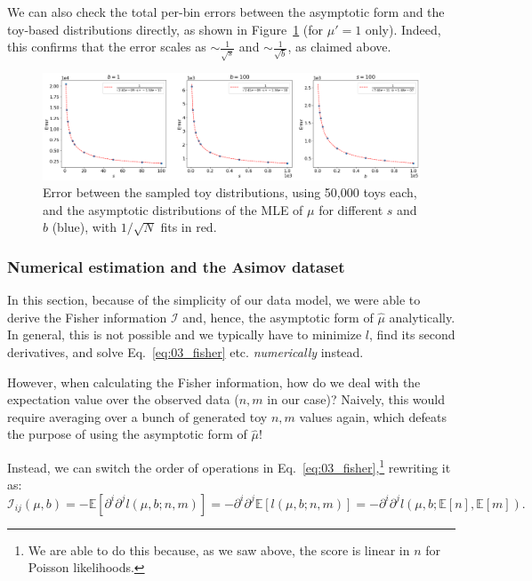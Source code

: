 We can also check the total per-bin errors between the asymptotic form and the toy-based distributions directly, as shown in Figure~\ref{fig:03_mle_errors} (for $\mu' = 1$ only).
Indeed, this confirms that the error scales as $\sim \frac{1}{\sqrt{s}}$ and $\sim \frac{1}{\sqrt{b}}$, as claimed above.

\begin{figure}[htb]
\centering
\includegraphics[width=\textwidth]{figures/03-Stats/05-asymptotic-mle/5.png}
\caption{Error between the sampled toy distributions, using 50,000 toys each, and the asymptotic distributions of the MLE of $\mu$ for different $s$ and $b$ (blue), with $1/\sqrt{N}$ fits in red.}
\label{fig:03_mle_errors}
\end{figure}


\subsubsection{Numerical estimation and the Asimov dataset}
\label{sec:03_pmle_asimov}

In this section, because of the simplicity of our data model, we were able to derive the Fisher information $\mathcal I$ and, hence, the asymptotic form of $\hat \mu$ analytically.
In general, this is not possible and we typically have to minimize $l$, find its second derivatives, and solve Eq.~\ref{eq:03_fisher} etc. \textit{numerically} instead. 

However, when calculating the Fisher information, how do we deal with the expectation value over the observed data ($n, m$ in our case)? Naively, this would require averaging over a bunch of generated toy $n, m$ values again, which defeats the purpose of using the asymptotic form of $\hat \mu$!

Instead, we can switch the order of operations in Eq.~\ref{eq:03_fisher},\footnote{We are able to do this because, as we saw above, the score is linear in $n$ for Poisson likelihoods.} rewriting it as:
\begin{equation}
  \mathcal I_{ij}(\mu, b) = - \mathbb E[\partial^i\partial^j l(\mu, b; n, m)] = - \partial^i\partial^j \mathbb E[l(\mu, b; n, m)] = -\partial^i\partial^j l(\mu, b; \mathbb E[n], \mathbb E[m]).
\label{eq:03_fisher_asimov}
\end{equation}

